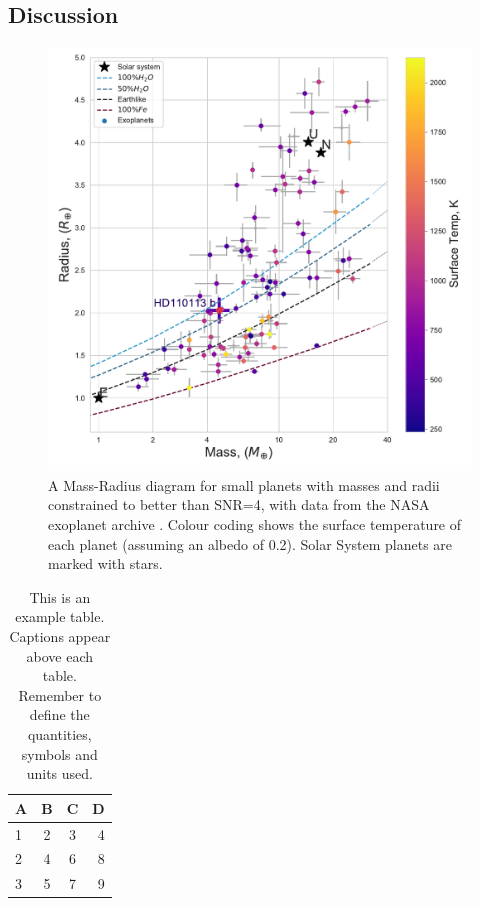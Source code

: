 \documentclass[fleqn,usenatbib]{mnras}
\begin{document}
\subsection{Discussion}


\begin{figure}
	\includegraphics[width=\columnwidth]{MR_Diagram_sm}
    \caption{A Mass-Radius diagram for small planets with masses and radii constrained to better than SNR=4, with data from the NASA exoplanet archive \citep{akeson2013nasa}. Colour coding shows the surface temperature of each planet (assuming an albedo of 0.2). Solar System planets are marked with stars.}
    \label{fig:example_figure}
\end{figure}

\begin{table}
	\centering
	\caption{This is an example table. Captions appear above each table.
	Remember to define the quantities, symbols and units used.}
	\label{tab:example_table}
	\begin{tabular}{lccr} %
		\hline
		A & B & C & D\\
		\hline
		1 & 2 & 3 & 4\\
		2 & 4 & 6 & 8\\
		3 & 5 & 7 & 9\\
		\hline
	\end{tabular}
\end{table}
\end{document}
